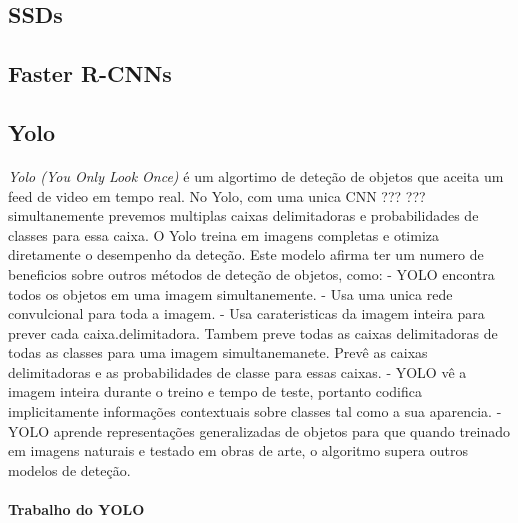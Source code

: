 \subsection{SSDs}

\subsection{Faster R-CNNs}

\subsection{Yolo}
\paragraph{}
\textit{\ac{Yolo} (You Only Look Once)} é um algortimo de deteção de objetos que aceita um feed de video em tempo real.
No Yolo, com uma unica CNN ??? ??? simultanemente prevemos multiplas caixas delimitadoras e probabilidades de classes para essa caixa. O Yolo treina em imagens completas e otimiza diretamente o desempenho da deteção. Este modelo afirma ter um numero de beneficios sobre outros métodos de deteção de objetos, como:
\newline - YOLO encontra todos os objetos em uma imagem simultanemente.
\newline - Usa uma unica rede convulcional para toda a imagem.
\newline - Usa carateristicas da imagem inteira para prever cada caixa.delimitadora. Tambem preve todas as caixas delimitadoras de todas as classes para uma imagem simultanemanete. Prevê as caixas delimitadoras e as probabilidades de classe para essas caixas.
\newline - YOLO vê a imagem inteira durante o treino e tempo de teste, portanto codifica implicitamente informações contextuais sobre classes tal como a sua aparencia.
\newline - YOLO aprende representações generalizadas de objetos para que quando treinado em imagens naturais e testado em obras de arte, o algoritmo supera outros modelos de deteção.

\paragraph{Trabalho do YOLO}
\paragraph{}

